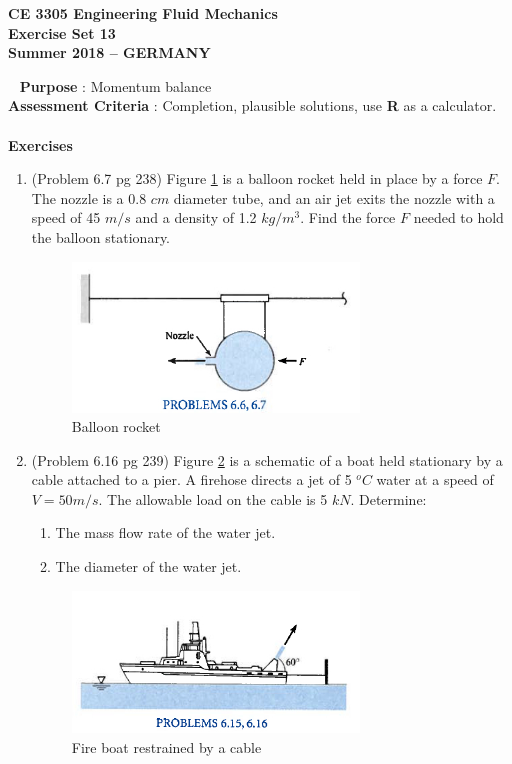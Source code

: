 \documentclass[12pt]{article}
\begin{document}
\begingroup
\begin{center}
{\textbf{{ CE 3305 Engineering Fluid Mechanics} \\ Exercise Set 13 \\ Summer 2018 -- GERMANY} }
\end{center}
\endgroup
\begingroup
~\newline
\textbf{Purpose} :  Momentum balance \\
\textbf{Assessment Criteria} : Completion, plausible solutions, use \textbf{R} as a calculator. \\~\\
\textbf{Exercises}

\begin{enumerate}
\item (Problem 6.7 pg 238)  Figure \ref{fig:JetBalloon} is a balloon rocket held in place by a force $F$.  
The nozzle is a 0.8 $cm$ diameter tube, and an air jet exits the nozzle with a speed of 45 $m/s$ and a density of 1.2 $kg/m^3$.  Find the force $F$ needed to hold the balloon stationary.
\begin{figure}[h!] %
   \centering
   \includegraphics[width=3in]{JetBalloon.jpg} 
   \caption{Balloon rocket}
   \label{fig:JetBalloon}
\end{figure}



\item (Problem 6.16 pg 239) 
Figure \ref{fig:JetBoat} is a schematic of a boat held stationary by a cable attached to a pier.  
A firehose directs a jet of 5 $^oC$ water at a speed of $V = 50 m/s$.  
The allowable load on the cable is 5 $kN$.
Determine:
\begin{enumerate}
\item The mass flow rate of the water jet.
\item The diameter of the water jet.
\end{enumerate}

\begin{figure}[h!] %
   \centering
   \includegraphics[width=3in]{JetBoat.jpg} 
   \caption{Fire boat restrained by a cable}
   \label{fig:JetBoat}
\end{figure}
\clearpage


\end{enumerate}
\end{document}
